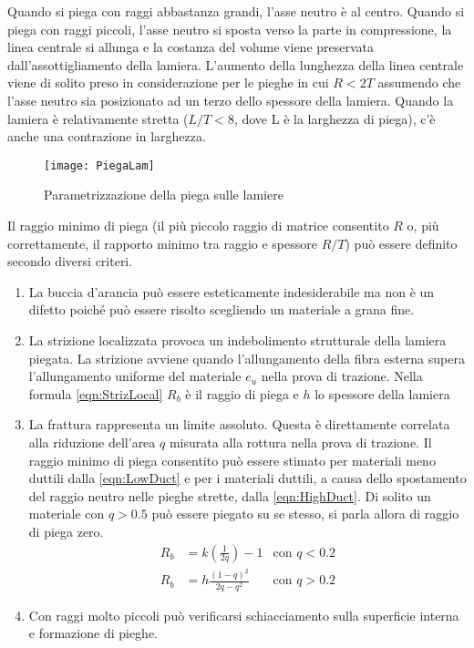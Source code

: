 Quando si piega con raggi abbastanza grandi, l'asse neutro è al centro. Quando si piega con raggi piccoli, l'asse neutro si sposta verso la parte in compressione, la linea centrale si allunga e la costanza del volume viene preservata dall'assottigliamento della lamiera.
L'aumento della lunghezza della linea centrale viene di solito preso in considerazione per le pieghe in cui $R < 2T$ assumendo che l'asse neutro sia posizionato ad un terzo dello spessore della lamiera.
Quando la lamiera è relativamente stretta ($L/T < 8$, dove L è la larghezza di piega), c'è anche una contrazione in larghezza.

\begin{figure}
\centering
\texttt{[image: PiegaLam]}
\caption{Parametrizzazione della piega sulle lamiere}
\label{fig:PiegaLam}
\end{figure}

Il raggio minimo di piega (il più piccolo raggio di matrice consentito $R$ o, più correttamente, il rapporto minimo tra raggio e spessore $R/T$) può essere definito secondo diversi criteri.
\pagebreak
\begin{enumerate}
\item La buccia d'arancia può essere esteticamente indesiderabile ma non è un difetto poiché può essere risolto scegliendo un materiale a grana fine.
\item La strizione localizzata provoca un indebolimento strutturale della lamiera piegata.
La strizione avviene quando l'allungamento della fibra esterna supera l'allungamento uniforme del materiale $e_u$ nella prova di trazione. Nella formula \eqref{eqn:StrizLocal} $R_b$ è il raggio di piega e $h$ lo spessore della lamiera
\item La frattura rappresenta un limite assoluto. Questa è direttamente correlata alla riduzione dell'area $q$ misurata alla rottura nella prova di trazione. Il raggio minimo di piega consentito può essere stimato per materiali meno duttili dalla \eqref{eqn:LowDuct} e per i materiali duttili, a causa dello spostamento del raggio neutro nelle pieghe strette,
dalla \eqref{eqn:HighDuct}.
Di solito un materiale con $q > 0.5$ può essere piegato su se stesso, si parla allora di raggio di piega zero.
\begin{align}
R_b &= k \left(\frac{1}{2q}\right)-1 & \text{con } q <0.2 \label{eqn:LowDuct}\\
R_b &= h\frac{(1-q)^2}{2q-q^2} & \text{con } q >0.2 \label{eqn:HighDuct}
\end{align}
\item Con raggi molto piccoli può verificarsi schiacciamento sulla superficie interna e formazione di pieghe.
\end{enumerate}

